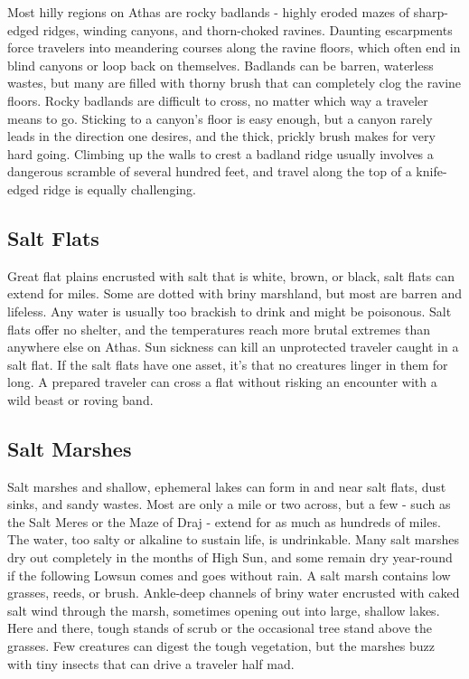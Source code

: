 \begin{multicols}{2}
Most hilly regions on Athas are rocky badlands - highly eroded mazes of
sharp-edged ridges, winding canyons, and thorn-choked ravines. Daunting
escarpments force travelers into meandering courses along the ravine
floors, which often end in blind canyons or loop back on themselves.
Badlands can be barren, waterless wastes, but many are filled with thorny brush
that can completely clog the ravine floors. Rocky badlands are difficult to cross,
no matter which way a traveler means to go. Sticking to a canyon's floor is easy
enough, but a canyon rarely leads in the direction one desires, and the thick,
prickly brush makes for very hard going. Climbing up the walls to crest a badland
ridge usually involves a dangerous scramble of several hundred feet, and travel
along the top of a knife-edged ridge is equally challenging.

\subsection{Salt Flats}

Great flat plains encrusted with salt that is white, brown, or black, salt flats
can extend for miles. Some are dotted with briny marshland, but most are barren
and lifeless. Any water is usually too brackish to drink and might be poisonous.
Salt flats offer no shelter, and the temperatures reach more brutal extremes
than anywhere else on Athas. Sun sickness can kill an unprotected traveler
caught in a salt flat. If the salt flats have one asset, it's that no creatures
linger in them for long. A prepared traveler can cross a flat without risking
an encounter with a wild beast or roving band.

\subsection{Salt Marshes}

Salt marshes and shallow, ephemeral lakes can form in and near salt flats, dust
sinks, and sandy wastes. Most are only a mile or two across, but a few - such as
the Salt Meres or the Maze of Draj - extend for as much as hundreds of miles.
The water, too salty or alkaline to sustain life, is undrinkable. Many salt
marshes dry out completely in the months of High Sun, and some remain dry
year-round if the following Lowsun comes and goes without rain. A salt marsh
contains low grasses, reeds, or brush. Ankle-deep channels of briny water
encrusted with caked salt wind through the marsh, sometimes opening out into
large, shallow lakes. Here and there, tough stands of scrub or the occasional
tree stand above the grasses. Few creatures can digest the tough vegetation,
     but the marshes buzz with tiny insects that can drive a traveler half mad.


\end{multicols}
